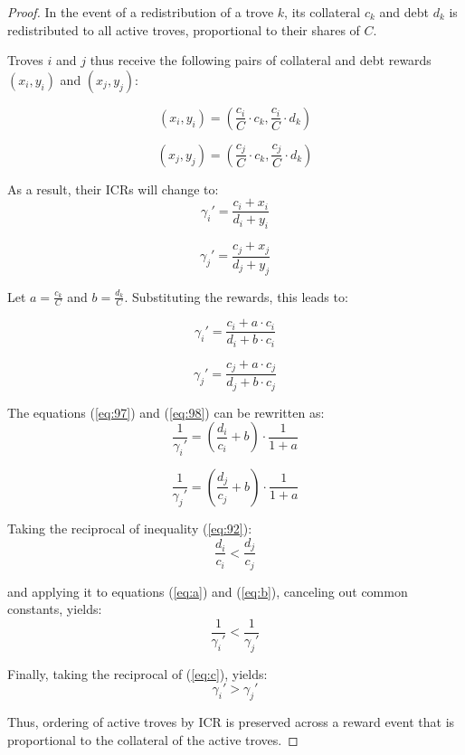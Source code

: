 \documentclass[reqno]{article}
\begin{document}
\begin{proof}
In the event of a redistribution of a trove $k$, its collateral $c_k$ and debt $d_k$ is redistributed to all active troves, proportional to their shares of $C$.

Troves $i$ and $j$ thus receive the following pairs of collateral and debt rewards $(x_i, y_i)$ and $(x_j, y_j)$:

\begin{equation} 
  (x_i, y_i) = \left(\frac{c_i}{C} \cdot c_k, \frac{c_i}{C} \cdot d_k\right)
\end{equation}

\begin{equation} 
   (x_j, y_j) = \left(\frac{c_j}{C} \cdot c_k, \frac{c_j}{C} \cdot d_k\right)
\end{equation}

As a result, their ICRs will change to:
\begin{equation} 
  \gamma_i' = \frac{c_i + x_i}{d_i + y_i} 
\end{equation}

\begin{equation} 
  \gamma_j' = \frac{c_j + x_j}{d_j + y_j} 
\end{equation}

Let $a = \frac{c_k}{C}$ and $b = \frac{d_k}{C}$. Substituting the rewards, this leads to:

\begin{equation} \label{eq:97}
  \gamma_i' = \frac{c_i + a \cdot c_i}{d_i + b \cdot c_i} 
\end{equation}

\begin{equation} \label{eq:98}
  \gamma_j' = \frac{c_j + a \cdot c_j}{d_j + b \cdot c_j} 
\end{equation}

The equations (\ref{eq:97}) and (\ref{eq:98}) can be rewritten as:
\begin{equation} \label{eq:a}
  \frac{1}{\gamma_i'} = \left(\frac{d_i}{c_i}+b\right) \cdot \frac{1}{1 + a}  
\end{equation}

\begin{equation} \label{eq:b}
  \frac{1}{\gamma_j'} = \left(\frac{d_j}{c_j}+b\right) \cdot \frac{1}{1 + a}  
\end{equation}

Taking the reciprocal of inequality (\ref{eq:92}):
\begin{equation}
  \frac{d_i}{c_i} < \frac{d_j}{c_j}
\end{equation}

and applying it to equations (\ref{eq:a}) and (\ref{eq:b}), canceling out common constants, yields:
\begin{equation} \label{eq:c}
  \frac{1}{\gamma_i'} < \frac{1}{\gamma_j'}
\end{equation}

Finally, taking the reciprocal of (\ref{eq:c}), yields:
\begin{equation}
  \gamma_i' > \gamma_j'
\end{equation}

Thus, ordering of active troves by ICR is preserved across a reward event that is proportional to the collateral of the active troves.
\end{proof}
\end{document}
